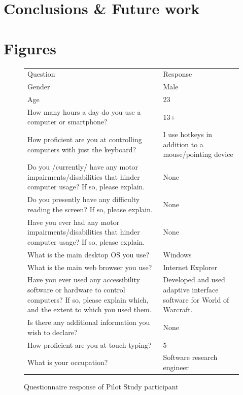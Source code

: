 \documentclass[a4paper, 12pt]{report}
\begin{document}
\chapter{Conclusions \& Future work}

\chapter{Figures}
\begin{figure}[ht]
\begin{tabularx}{\textwidth}{X|X}
\hline\hline %
Question & Response \\ [0.5ex] %
Gender	&	Male	\\
Age	&	23	\\
How many hours a day do you use a computer or smartphone?	&	13+	\\
How proficient are you at controlling computers with just the keyboard?	&	I use hotkeys in addition to a mouse/pointing device	\\
Do you /currently/ have any motor impairments/disabilities that hinder computer usage? If so, please explain.	&	None	\\
Do you presently have any difficulty reading the screen? If so, please explain.	&	None	\\
Have you ever had any motor impairments/disabilities that hinder computer usage? If so, please explain.	&	None	\\
What is the main desktop OS you use?	&	Windows	\\
What is the main web browser you use?	&	Internet Explorer	\\
Have you ever used any accessibility software or hardware to control computers? If so, please explain which, and the extent to which you used them.	&	Developed and used adaptive interface software for World of Warcraft.	\\
Is there any additional information you wish to declare?	&	None	\\
How proficient are you at touch-typing?	&	5	\\
What is your occupation?	&	Software research engineer	\\ [1ex] %
\hline %
\end{tabularx}
\caption{Questionnaire response of Pilot Study participant}
\label{fig:partic_pilotpre}
\end{figure}
\end{document}
